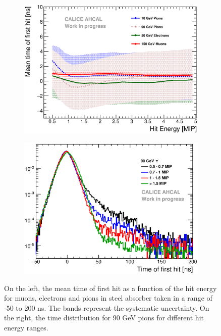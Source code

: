 \begin{figure}[htbp!]
	\begin{subfigure}[t]{0.49\textwidth}
		\centering
		\includegraphics[width=1\textwidth]{../Thesis_Plots/Timing/Pions/Plots/Timing_Energy_Comparison_ShortAsymRange.eps}
		\caption{} \label{fig:Energy_Comparison}
	\end{subfigure}
	\hfill
	\begin{subfigure}[t]{0.49\textwidth}
		\centering
		\includegraphics[width=1\textwidth]{../Thesis_Plots/Timing/Pions/Plots/TimeEnergyBinsPions.eps}
		\caption{} \label{fig:TimeBinsEnergy}
	\end{subfigure}
	\caption{On the left, the mean time of first hit as a function of the hit energy for muons, electrons and pions in steel absorber taken in a range of -50 to 200 ns. The bands represent the systematic uncertainty. On the right, the time distribution for 90 GeV pions for different hit energy ranges.}
\end{figure}

